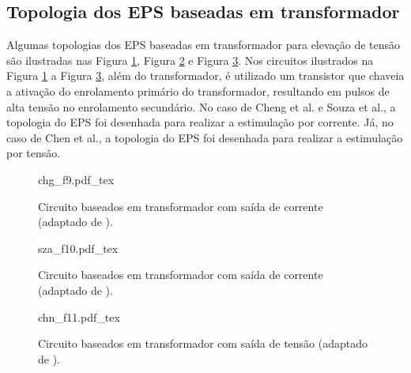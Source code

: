 \subsection*{Topologia dos \acrshort{EPS} baseadas em transformador}

Algumas topologias dos EPS baseadas em transformador para elevação de tensão são ilustradas nas Figura \ref{fig:chg_f9}, Figura \ref{fig:sza_f10} e Figura \ref{fig:chn_f11}. Nos circuitos ilustrados na Figura \ref{fig:chg_f9} a Figura \ref{fig:chn_f11}, além do transformador, é utilizado um transistor que chaveia a ativação do enrolamento primário do transformador, resultando em pulsos de alta tensão no enrolamento secundário. No caso de Cheng et al. e Souza et al., a topologia do \acrshort{EPS} foi desenhada para realizar a estimulação por corrente. Já, no caso de Chen et al., a topologia do \acrshort{EPS} foi desenhada para realizar a estimulação por tensão. 


\begin{figure}[h]
    \centering %
    \small %
    \def\svgwidth{0.75
    \columnwidth}%
    {chg_f9.pdf_tex}
    \caption{Circuito baseados em transformador com saída de corrente (adaptado de \cite{Cheng2004}).}
    \label{fig:chg_f9}
\end{figure}

\begin{figure}[h]
    \centering %
    \small %
    \def\svgwidth{0.78
    \columnwidth}%
    {sza_f10.pdf_tex}
    \caption{Circuito baseados em transformador com saída de corrente (adaptado de \cite{Souza2012a}).}
    \label{fig:sza_f10}
\end{figure}

\begin{figure}
    \centering %
    \small %
    \def\svgwidth{0.6
    \columnwidth}%
    {chn_f11.pdf_tex}
    \caption{Circuito baseados em transformador com saída de tensão (adaptado de \cite{Chen2013}).}
    \label{fig:chn_f11}
\end{figure}

